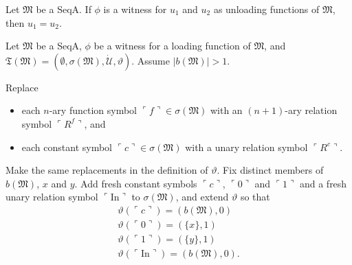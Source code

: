 \documentclass[12pt]{article}
\numberwithin{equation}{section}
\begin{document}
\begin{fact}\label{fact216}
Let $\mathfrak{M}$ be a SeqA. If $\phi$ is a witness for $u_1$ and $u_2$ as unloading functions of $\mathfrak{M}$, then $u_1 = u_2$.
\end{fact}

Let $\mathfrak{M}$ be a SeqA, $\phi$ be a witness for a loading function of $\mathfrak{M}$, and $\mathfrak{T}(\mathfrak{M}) = (\emptyset, \sigma(\mathfrak{M}), \dot{\mathcal{U}}, \vartheta)$. Assume $|b(\mathfrak{M})| > 1$. 

Replace
\begin{itemize}
    \item each $n$-ary function symbol $\ulcorner f \urcorner \in \sigma(\mathfrak{M})$ with an $(n+1)$-ary relation symbol $\ulcorner R^f \urcorner$, and
    \item each constant symbol $\ulcorner c \urcorner \in \sigma(\mathfrak{M})$ with a unary relation symbol $\ulcorner R^c \urcorner$.
\end{itemize}
Make the same replacements in the definition of $\vartheta$. Fix distinct members of $b(\mathfrak{M})$, $x$ and $y$. Add fresh constant symbols $\ulcorner c \urcorner$, $\ulcorner 0 \urcorner$ and $\ulcorner 1 \urcorner$ and a fresh unary relation symbol $\ulcorner \mathrm{In} \urcorner$ to $\sigma(\mathfrak{M})$, and extend $\vartheta$ so that
\begin{gather*}
    \vartheta(\ulcorner c \urcorner) = (b(\mathfrak{M}), 0) \\
    \vartheta(\ulcorner 0 \urcorner) = (\{x\}, 1) \\
    \vartheta(\ulcorner 1 \urcorner) = (\{y\}, 1) \\
    \vartheta(\ulcorner \mathrm{In} \urcorner) = (b(\mathfrak{M}), 0) \text{.}
\end{gather*}
\end{document}
